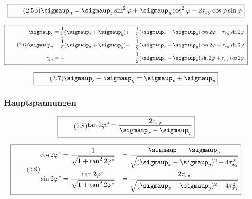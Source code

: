 \documentclass[11pt]{article}
\newcommand{\1}{ {\mathds{1}} }
\renewcommand{\sigma  }{\sigmaup   }
\begin{document}
		\begin{equation}
			\boxed{
				\tag{2.5b}
				\begin{split}
					\sigma_{\eta}
					=
					\sigma_{x} \sin^2 \varphi + \sigma_y \cos^2 \varphi - 2 \tau_{xy} \cos\varphi\sin\varphi
				\end{split}
			}
		\end{equation}

		\begin{equation}
			\boxed{
				\tag{2.6}
				\begin{split}
					\sigma_{\xi} &= \frac{1}{2} (\sigma_x + \sigma_y) +&\frac{1}{2}(\sigma_x - \sigma_y) \cos 2 \varphi + \tau_{xy} \sin 2 \varphi, \\
					\sigma_{\eta} &= \frac{1}{2} (\sigma_x + \sigma_y) -&\frac{1}{2}(\sigma_x - \sigma_y) \cos 2 \varphi + \tau_{xy} \sin 2 \varphi,\\
					\tau_{\xi \eta} &= -&\frac{1}{2}(\sigma_x - \sigma_y) \sin 2 \varphi + \tau_{xy} \cos 2 \varphi,
				\end{split}
			}
		\end{equation}
		
		\begin{equation}
			\boxed{
				\tag{2.7}
				\begin{split}
					\sigma_\xi + \sigma_\eta
					=
					\sigma_x + \sigma_y
				\end{split}
			}
		\end{equation}

		\subsubsection{Hauptspannungen}
		
		\begin{equation}
			\boxed{
				\tag{2.8}
				\begin{split}
					\tan 2\varphi^\ast
					=
					\frac{2 \tau_{xy}}{\sigma_x - \sigma_y}
				\end{split}
			}
		\end{equation}

		\begin{equation}
			\boxed{
				\tag{2.9}
				\begin{split}
					\cos 2\varphi^\ast
					&=
					\frac{1}{\sqrt{1+ \tan^2 2\varphi^\ast}}
					&=
					\frac{\sigma_x - \sigma_y}{\sqrt{(\sigma_x - \sigma_y)^2 + 4 \tau_{xy}^2}} \\
					\sin 2\varphi^\ast
					&=
					\frac{\tan 2\varphi^\ast}{\sqrt{1+ \tan^2 2\varphi^\ast}}
					&=
					\frac{2\tau_{xy}}{\sqrt{(\sigma_x - \sigma_y)^2 + 4 \tau_{xy}^2}} \\					
				\end{split}
			}
		\end{equation}
\end{document}
